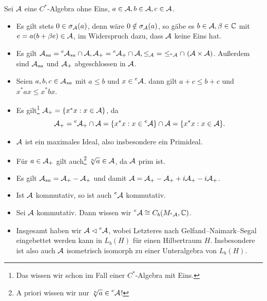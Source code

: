 \begin{remark}
    Sei $\mathcal{A}$ eine $C^*$-Algebra ohne Eins, $a \in \mathcal{A}, b \in \mathcal{A}, c \in \mathcal{A}$.
    \begin{itemize}
        \item Es gilt stets $0 \in \sigma_{\mathcal{A}}(a)$, denn wäre $0 \notin \sigma_{\mathcal{A}}(a)$, so gäbe es $b \in \mathcal{A}, \beta \in \mathbb{C}$ mit $e = a(b+\beta e) \in \mathcal{A}$, im Widerspruch dazu, dass $\mathcal{A}$ keine Eins hat.
        \item Es gilt $\mathcal{A}_{sa} = \prescript{e}{}{\mathcal{A}}_{sa} \cap \mathcal{A}, \mathcal{A}_+ = \prescript{e}{}{\mathcal{A}}_+ \cap \mathcal{A}, \leq_{\mathcal{A}} \ = \ \leq_{\prescript{e}{}{\mathcal{A}}} \cap \ (\mathcal{A} \times \mathcal{A})$. Außerdem sind $\mathcal{A}_{sa}$ und $\mathcal{A}_+$ abgeschlossen in $\mathcal{A}$.
        \item Seien $a, b, c \in \mathcal{A}_{sa}$ mit $a \leq b$ und $x \in \prescript{e}{}{\mathcal{A}}$. dann gilt $a + c \leq b + c$ und $x^* a x \leq x^* b x$.
        \item Es gilt\footnote{Das wissen wir schon im Fall einer $C^*$-Algebra mit Eins.} $\mathcal{A}_+ = \{ x^* x : x \in \mathcal{A} \}$, da
        $$ \mathcal{A}_+ = \prescript{e}{}{\mathcal{A}}_+ \cap \mathcal{A} = \{ x^* x : x \in \prescript{e}{}{\mathcal{A}} \} \cap \mathcal{A} = \{ x^* x : x \in \mathcal{A} \}. $$
        \item $\mathcal{A}$ ist ein maximales Ideal, also insbesondere ein Primideal.
        \item Für $a \in \mathcal{A}_+$ gilt auch\footnote{A priori wissen wir nur $\sqrt[n]{a} \in \prescript{e}{}{\mathcal{A}}$!} $\sqrt[n]{a} \in \mathcal{A}$, da $\mathcal{A}$ prim ist.
        \item Es gilt $\mathcal{A}_{sa} = \mathcal{A}_+ - \mathcal{A}_+$ und damit $\mathcal{A} = \mathcal{A}_+ - \mathcal{A}_+ + i \mathcal{A}_+ - i \mathcal{A}_+$.
        \item Ist $\mathcal{A}$ kommutativ, so ist auch $\prescript{e}{}{\mathcal{A}}$ kommutativ.
        \item Sei $\mathcal{A}$ kommutativ. Dann wissen wir $\prescript{e}{}{\mathcal{A}} \cong C_b(M_{\prescript{e}{}{\mathcal{A}}}, \mathbb{C})$.
        \item Insgesamt haben wir $\mathcal{A} \vartriangleleft \prescript{e}{}{\mathcal{A}}$, wobei Letzteres nach Gelfand--Naimark--Segal eingebettet werden kann in $L_b(H)$ für einen Hilbertraum $H$. Insbesondere ist also auch $\mathcal{A}$ isometrisch isomorph zu einer Unteralgebra von $L_b(H)$.
    \end{itemize}
\end{remark}